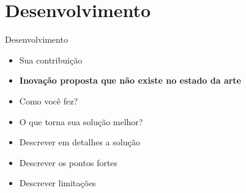 \section{Desenvolvimento}

\begin{frame}	
	\begin{block}{Desenvolvimento}
		 \begin{itemize}
			  \item Sua contribuição			  
			  \item \textbf{Inovação proposta que não existe no estado da arte}
			  \item Como você fez?
			  \item O que torna sua solução melhor?
			  \item Descrever em detalhes a solução
			  \item Descrever os pontos fortes
			  \item Descrever limitações
		  \end{itemize}
	\end{block}
\end{frame}
